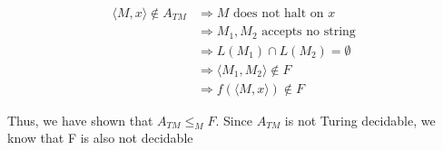 \documentclass[12pt]{article}
\begin{document}
\begin{align*}
\langle M,x \rangle \notin {A}_{TM} & \Rightarrow  M \textrm{ does not halt on $x$} \\ 
& \Rightarrow M_1,M_2 \textrm{ accepts no string } \\
& \Rightarrow   L(M_1) \cap L(M_2) = \emptyset \\
& \Rightarrow  \langle M_1, M_2\rangle \notin F\\
& \Rightarrow  f(\langle M,x \rangle) \notin F
\end{align*}

Thus, we have shown that $A_{TM} \le_M F $. Since $A_{TM}$ is not Turing decidable, we know that F is also not decidable
\end{document}
